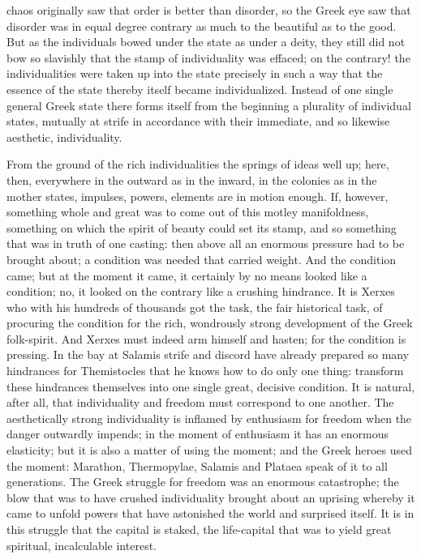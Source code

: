 \documentclass[12pt]{book}
\newcommand{\opage}[1]{\marginnote{\footnotesize\textit{[#1]}}}
\begin{document}
chaos originally saw that order is better than disorder, so the Greek
eye saw that disorder was in equal degree contrary as much to the
beautiful as to the good. But as the individuals bowed under the state
as under a deity, they still did not bow so slavishly that the stamp of
individuality was effaced; on the contrary! the individualities were
taken up into the state precisely in such a way that the essence of the
state thereby itself became individualized. Instead of one single
\opage{25}\setcounter{footnote}{0}%
general Greek state there forms itself from the beginning a plurality
of individual states, mutually at strife in accordance with their
immediate, and so likewise aesthetic, individuality.

From the ground of the rich individualities the springs of ideas well
up; here, then, everywhere in the outward as in the inward, in the
colonies as in the mother states, impulses, powers, elements are in
motion enough. If, however, something whole and great was to come out of
this motley manifoldness, something on which the spirit of beauty could
set its stamp, and so something that was in truth of one casting: then
above all an enormous pressure had to be brought about; a condition was
needed that carried weight. And the condition came; but at the moment it
came, it certainly by no means looked like a condition; no, it looked on
the contrary like a crushing hindrance. It is Xerxes who with his
hundreds of thousands got the task, the fair historical task, of
procuring the condition for the rich, wondrously strong development of
the Greek folk-spirit. And Xerxes must indeed arm himself and hasten; for
the condition is pressing. In the bay at Salamis strife and discord have
already prepared so many hindrances for Themistocles that he knows how
to do only one thing: transform these hindrances themselves into one
single great, decisive condition. It is natural, after all, that
individuality and freedom must correspond to one another. The
aesthetically strong individuality is inflamed by enthusiasm for freedom
when the danger outwardly impends; in the moment of enthusiasm it has an
enormous elasticity; but it is also a matter of using the moment; and
the Greek heroes used the moment: Marathon, Thermopylae, Salamis and
Plataea speak of it to all generations. The Greek struggle for freedom
was an enormous catastrophe; the blow that was to have crushed
individuality brought about
\opage{26}\setcounter{footnote}{0}%
an uprising whereby it came to unfold powers that have astonished the
world and surprised itself. It is in this struggle that the capital is
staked, the life-capital that was to yield great spiritual, incalculable
interest.
\end{document}
